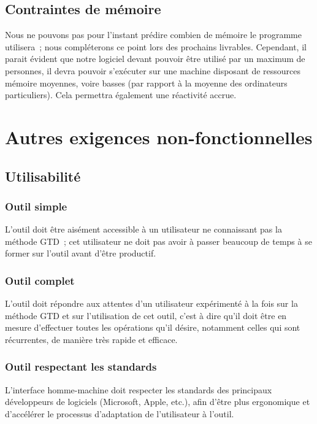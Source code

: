 	\subsection{Contraintes de mémoire}

Nous ne pouvons pas pour l'instant prédire combien de mémoire le programme utilisera~; nous compléterons ce point lors des prochains livrables.
Cependant, il parait évident que notre logiciel devant pouvoir être utilisé par un maximum de personnes, il devra pouvoir s'exécuter sur une machine disposant de ressources mémoire moyennes, voire basses (par rapport à la moyenne des ordinateurs particuliers).
Cela permettra également une réactivité accrue.


\section{Autres exigences non-fonctionnelles}

	\subsection{Utilisabilité}

	\subsubsection{Outil simple}
L'outil doit être aisément accessible à un utilisateur ne connaissant pas la méthode GTD~; cet utilisateur ne doit pas avoir à passer beaucoup de temps à se former sur l'outil avant d'être productif.

	\subsubsection{Outil complet}
L'outil doit répondre aux attentes d'un utilisateur expérimenté à la fois sur la méthode GTD et sur l'utilisation de cet outil, c'est à dire qu'il doit être en mesure d'effectuer toutes les opérations qu'il désire, notamment celles qui sont récurrentes, de manière très rapide et efficace.

	\subsubsection{Outil respectant les standards}
L'interface homme-machine doit respecter les standards des principaux développeurs de logiciels (Microsoft, Apple, etc.), afin d'être plus ergonomique et d'accélérer le processus d'adaptation de l'utilisateur à l'outil.


